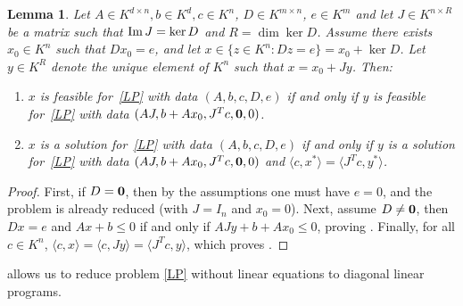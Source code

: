 \documentclass{elsarticle}
\theoremstyle{plain}
\newtheorem{lemma}[theorem]{Lemma}
\theoremstyle{definition}
\newcommand{\OK}{\mathcal{O}_K}
\begin{document}
\begin{lemma}\label{reducD}
  Let $A \in K^{d \times n}, b \in K^d, c\in K^n$, $D \in K^{m\times n}$,
  $e \in K^m$ and let $J \in K^{n \times R}$ be a matrix such that
  ${\rm Im}\, J = \ker D$ and $R = \dim \ker D$.
  Assume there exists $x_0 \in K^n$ such that $D x_0 = e$, and let
  $x \in \{z \in K^n : Dz = e\} = x_0 + \ker D$.
  Let $y \in K^R$ denote the unique element of $K^n$ such that
  $x = x_0 + J y$. Then:
  \begin{enumerate}
  \item\label{reducD_item1}
    $x$ is feasible for~\eqref{LP} with data $(A,b,c,D,e)$ if and only if 
    $y$ is feasible for~\eqref{LP} with data $(AJ,b+A x_0,J^T c,{\bf 0},0)$.
  \item\label{reducD_item2}
    $x$ is a solution for~\eqref{LP} with data $(A,b,c,D,e)$ if and only if 
    $y$ is a solution for~\eqref{LP} with data $(AJ,b+A x_0,J^T c,{\bf 0},0)$ and
    $\langle c,x^* \rangle = \langle J^T c,y^* \rangle$.
  \end{enumerate}
\end{lemma}
\begin{proof}
  First, if $D={\bf 0}$, then by the assumptions one must have $e=0$, and the problem
  is already reduced (with $J=I_n$ and $x_0=0$).
  Next, assume $D\neq{\bf 0}$, then $Dx=e$ and $Ax + b \le 0$ if and only if
  $AJy + b+Ax_0 \le 0$, proving . Finally, for all
  $c \in K^n$, $\langle c,x\rangle = \langle c, Jy\rangle = \langle J^T c,y\rangle$, which proves .
\end{proof}


 allows us to reduce problem \eqref{LP} without linear equations
to diagonal linear programs.
\end{document}
